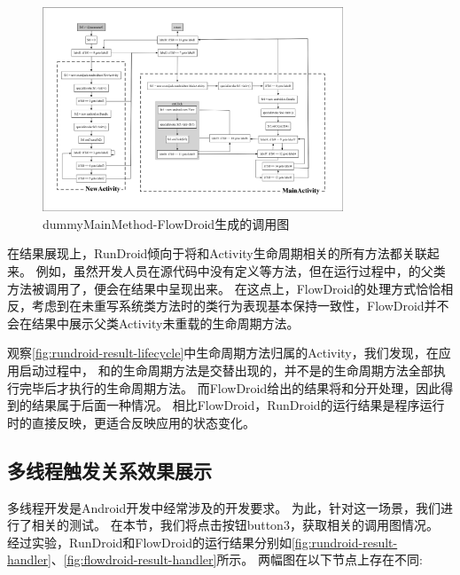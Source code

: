 \begin{figure}[ht]
	\centering
	\includegraphics[width=0.8\textwidth]{./Figures/flowdroid-dummyMainMethod.png}
	\caption{dummyMainMethod-FlowDroid生成的调用图}
	\label{fig:flowdroid-result-lifecycle}
\end{figure}

在结果展现上，RunDroid倾向于将和Activity生命周期相关的所有方法都关联起来。
例如，虽然开发人员在源代码中没有定义等方法，但在运行过程中，的父类方法被调用了，便会在结果中呈现出来。
在这点上，FlowDroid的处理方式恰恰相反，考虑到在未重写系统类方法时的类行为表现基本保持一致性，FlowDroid并不会在结果中展示父类Activity未重载的生命周期方法。




	观察\autoref{fig:rundroid-result-lifecycle}中生命周期方法归属的Activity，我们发现，在应用启动过程中，
	和的生命周期方法是交替出现的，并不是的生命周期方法全部执行完毕后才执行的生命周期方法。
	而FlowDroid给出的结果将和分开处理，因此得到的结果属于后面一种情况。
	相比FlowDroid，RunDroid的运行结果是程序运行时的直接反映，更适合反映应用的状态变化。


\subsection{多线程触发关系效果展示}

多线程开发是Android开发中经常涉及的开发要求。
为此，针对这一场景，我们进行了相关的测试。
在本节，我们将点击按钮button3，获取相关的调用图情况。
经过实验，RunDroid和FlowDroid的运行结果分别如\autoref{fig:rundroid-result-handler}、\autoref{fig:flowdroid-result-handler}所示。
两幅图在以下节点上存在不同:





